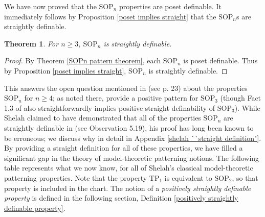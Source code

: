 \documentclass[10pt,a4paper]{amsart}
\newcommand{\SOP}{\text{SOP}}
\newcommand{\TPi}{\text{TP}_1}
\newtheorem{theorem}{Theorem}
\begin{document}
We have now proved that the $\SOP_n$ properties are poset definable. It immediately follows by Proposition \ref{poset implies straight} that the $\SOP_n$s are straightly definable. 

\begin{theorem}\label{SOPn straightly definable}
    For $n\geq 3$, $\mathrm{SOP}_n$ is straightly definable.
\end{theorem}

\begin{proof}
    By Theorem \ref{SOPn pattern theorem}, each $\SOP_n$ is poset definable. Thus by Proposition \ref{poset implies straight}, $\SOP_n$ is straightly definable.
\end{proof}

This answers the open question mentioned in \cite{bailetti2024walk} (see p. 23) about the properties $\text{SOP}_n$ for $n\geq 4$; as noted there, \cite{kaplan2024generic} provide a positive pattern for $\SOP_3$ (though Fact 1.3 of \cite{shelah_usvyatsov_2008} also straightforwardly implies positive straight definability of $\mathrm{SOP}_{3}$).  While Shelah claimed to have demonstrated that all of the properties $\SOP_n$  are straightly definable in \cite{shelah_what_2000} (see Observation 5.19), his proof has long been known to be erroneous; we discuss why in detail in Appendix \ref{shelah ``straight definition"}. By providing a straight definition for all of these properties, we have filled a significant gap in the theory of model-theoretic patterning notions. The following table represents what we now know, for all of Shelah's classical model-theoretic patterning properties. Note that the property $\TPi$ is equivalent to $\SOP_2$, so that property is included in the chart. The notion of a \textit{positively straightly definable property} is defined in the following section, Definition \ref{positively straightly definable property}.


\:
\end{document}
